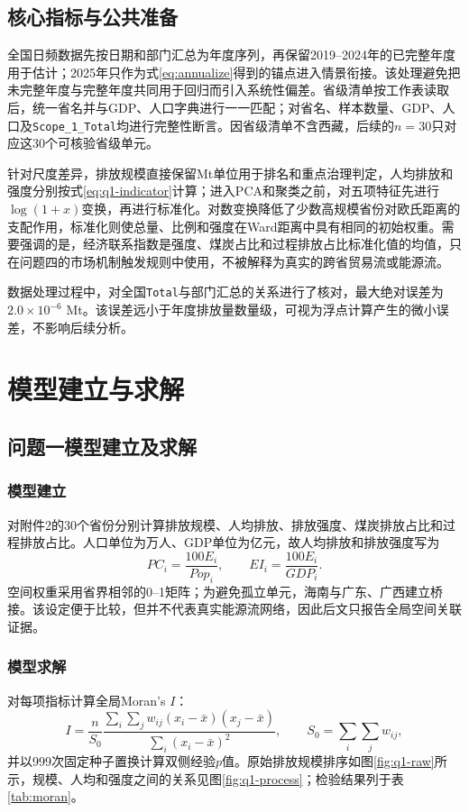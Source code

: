 \documentclass[12pt,a4paper]{ctexart}
\theoremstyle{definition}
\theoremstyle{plain}
\theoremstyle{remark}
\begin{document}
\subsection{核心指标与公共准备}
全国日频数据先按日期和部门汇总为年度序列，再保留2019--2024年的已完整年度用于估计；2025年只作为式\eqref{eq:annualize}得到的锚点进入情景衔接。该处理避免把未完整年度与完整年度共同用于回归而引入系统性偏差。省级清单按工作表读取后，统一省名并与GDP、人口字典进行一一匹配；对省名、样本数量、GDP、人口及\texttt{Scope\_1\_Total}均进行完整性断言。因省级清单不含西藏，后续的$n=30$只对应这30个可核验省级单元。

针对尺度差异，排放规模直接保留Mt单位用于排名和重点治理判定，人均排放和强度分别按式\eqref{eq:q1-indicator}计算；进入PCA和聚类之前，对五项特征先进行$\log(1+x)$变换，再进行标准化。对数变换降低了少数高规模省份对欧氏距离的支配作用，标准化则使总量、比例和强度在Ward距离中具有相同的初始权重。需要强调的是，经济联系指数是强度、煤炭占比和过程排放占比标准化值的均值，只在问题四的市场机制触发规则中使用，不被解释为真实的跨省贸易流或能源流。

数据处理过程中，对全国\texttt{Total}与部门汇总的关系进行了核对，最大绝对误差为$2.0\times10^{-6}$ Mt。该误差远小于年度排放量数量级，可视为浮点计算产生的微小误差，不影响后续分析。
\section{模型建立与求解}

\subsection{问题一模型建立及求解}

\subsubsection{模型建立}
对附件2的30个省份分别计算排放规模、人均排放、排放强度、煤炭排放占比和过程排放占比。人口单位为万人、GDP单位为亿元，故人均排放和排放强度写为
\begin{equation}
PC_i=\frac{100E_i}{Pop_i},\qquad EI_i=\frac{100E_i}{GDP_i}.
\label{eq:q1-indicator}
\end{equation}
空间权重采用省界相邻的0--1矩阵；为避免孤立单元，海南与广东、广西建立桥接。该设定便于比较，但并不代表真实能源流网络，因此后文只报告全局空间关联证据。

\subsubsection{模型求解}
对每项指标计算全局Moran's $I$\cite{moran}：
\begin{equation}
I=\frac{n}{S_0}\frac{\sum_i\sum_jw_{ij}(x_i-\bar x)(x_j-\bar x)}{\sum_i(x_i-\bar x)^2},\qquad S_0=\sum_i\sum_jw_{ij},
\label{eq:moran}
\end{equation}
并以999次固定种子置换计算双侧经验$p$值。原始排放规模排序如图\ref{fig:q1-raw}所示，规模、人均和强度之间的关系见图\ref{fig:q1-process}；检验结果列于表\ref{tab:moran}。
\end{document}
